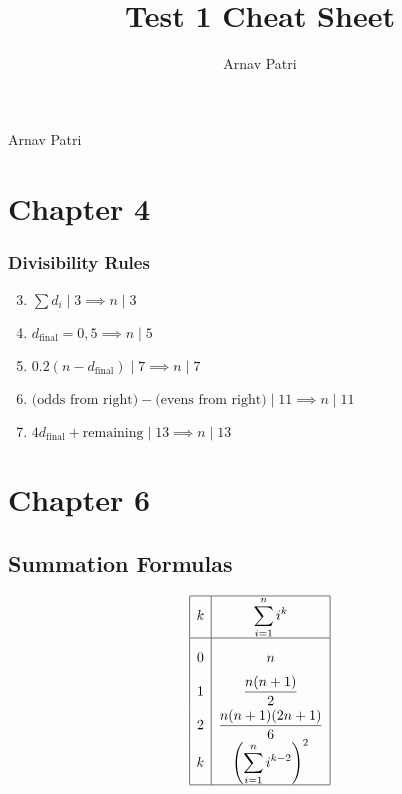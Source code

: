 \documentclass[12pt, A4, twocolumn]{article}
\title{Test 1 Cheat Sheet}
\author{Arnav Patri}
\begin{document}
	Arnav Patri
	\section*{Chapter 4}
		\subsubsection*{Divisibility Rules}
			\begin{enumerate}
				\setcounter{enumi}{2}
				\item
					\(\displaystyle\sum d_i \mid 3 \implies n \mid 3\)
				\setcounter{enumi}{4}
				\item
					\(d_{\text{final}} = 0, 5 \implies n \mid 5\)
				\setcounter{enumi}{6}
				\item
					\(0.2(n - d_{\text{final}}) \mid 7 \implies n \mid 7\)
				\setcounter{enumi}{10}
				\item
					\(\text{(odds from right)} - \text{(evens from right)} \mid 11 \implies n \mid 11\)
				\setcounter{enumi}{12}
				\item
					\(4d_{\text{final}} + \text{remaining} \mid 13 \implies n \mid 13\)
			\end{enumerate}
	\section*{Chapter 6}
		\subsection*{Summation Formulas}
			\[\def\arraystretch{2}\begin{array}{|c|c|}\hline
				k & \displaystyle\sum_{i = 1}^n i^k \\\hline
				0 & n \\
				1 & \dfrac{n(n + 1)}{2} \\
				2 & \dfrac{n(n + 1)(2n + 1)}{6} \\
				k & \displaystyle\left(\sum_{i = 1}^n i^{k - 2}\right)^2 \\\hline
			\end{array}\]	
\end{document}
